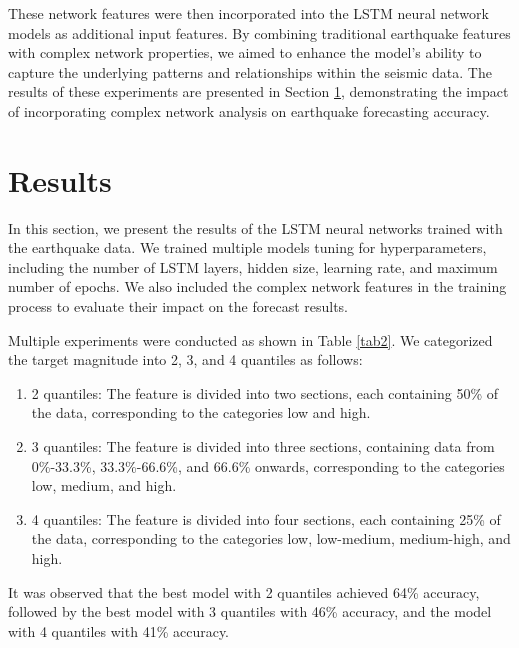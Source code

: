 \documentclass[sn-mathphys-num]{sn-jnl}
\begin{document}
These network features were then incorporated into the LSTM neural network models as additional input features. By combining traditional earthquake features with complex network properties, we aimed to enhance the model's ability to capture the underlying patterns and relationships within the seismic data. The results of these experiments are presented in Section \ref{results}, demonstrating the impact of incorporating complex network analysis on earthquake forecasting accuracy.

\section{Results}\label{results}

In this section, we present the results of the LSTM neural networks trained with the earthquake data. We trained multiple models tuning for hyperparameters, including the number of LSTM layers, hidden size, learning rate, and maximum number of epochs. We also included the complex network features in the training process to evaluate their impact on the forecast results.

Multiple experiments were conducted as shown in Table \ref{tab2}. We categorized the target magnitude into 2, 3, and 4 quantiles as follows:
\begin{enumerate}
    \item 2 quantiles: The feature is divided into two sections, each containing 50\% of the data, corresponding to the categories low and high.
    \item 3 quantiles: The feature is divided into three sections, containing data from 0\%-33.3\%, 33.3\%-66.6\%, and 66.6\% onwards, corresponding to the categories low, medium, and high.
    \item 4 quantiles: The feature is divided into four sections, each containing 25\% of the data, corresponding to the categories low, low-medium, medium-high, and high.
\end{enumerate}

It was observed that the best model with 2 quantiles achieved 64\% accuracy, followed by the best model with 3 quantiles with 46\% accuracy, and the model with 4 quantiles with 41\% accuracy.
\end{document}
